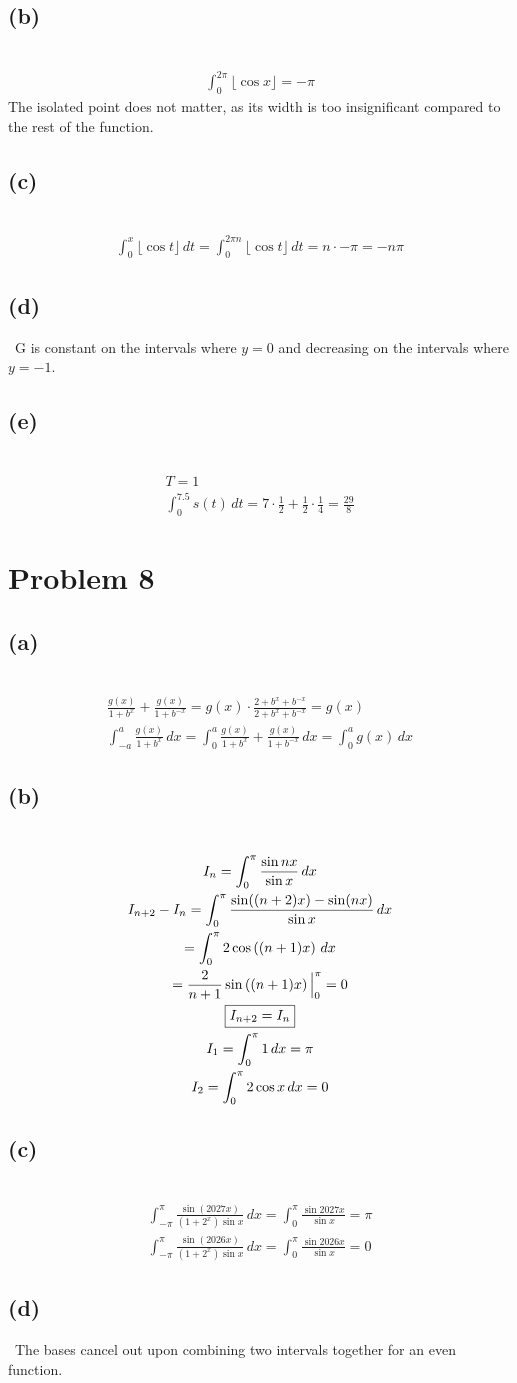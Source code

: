 \documentclass[12pt]{article}
\newcommand*{\paren}[1]{\ensuremath\left(#1\right)}
\newcommand{\floor}[1]{\lfloor #1 \rfloor}
\newcommand{\vem}{\vspace{0.5em}}
\newcommand{\problem}[1]{\section{Problem #1}}
\newcommand{\subproblem}[1]{\subsection{(#1)} \,}
\begin{document}
\subproblem{b}
\begin{gather*}
    \int_0^{2\pi} \floor{\cos x} = -\pi 
\end{gather*}
The isolated point does not matter, as its width is too insignificant compared to the rest of the function. \vem

\subproblem{c}
\begin{gather*}
    \int_0^x \floor{\cos t}\, dt = \int_0^{2\pi n} \floor{\cos t}\, dt = n\cdot -\pi =\boxed{-n\pi}
\end{gather*}

\subproblem{d}
G is constant on the intervals where $y=0$ and decreasing on the intervals where $y=-1$.\vem

\subproblem{e}
\begin{gather*}
    T=1\\
    \int_0^{7.5} s(t)\,d t=7\cdot \frac{1}{2}+ \frac{1}{2}\cdot \frac{1}{4}=\boxed{\frac{29}{8}}
\end{gather*}

\problem{8}

\subproblem{a}
\begin{gather*}
    \frac{g(x)}{1+b^x}+\frac{g(x)}{1+b^{-x}} = g(x)\cdot \frac{2+b^x+b^{-x}}{2+b^x+b^{-x}} =g(x)\\
    \int_{-a}^a \frac{g(x)}{1+b^x}\, dx= \int_0^a \frac{g(x)}{1+b^x}+\frac{g(x)}{1+b^{-x}} \, dx = \int_0^a  g(x)\, dx
\end{gather*}

\subproblem{b}
\begin{gather*}
    I_n =\int_0^\pi \frac{\sin nx}{\sin x}\, dx\\
    I_{n+2} - I_n = \int_0^\pi \frac{\sin((n+2)x) - \sin(nx)}{\sin x} \, dx\\
    =\int_0^\pi 2\cos \paren{(n+1)x}\, dx\\
    = \frac{2}{n+1} \sin \paren{(n+1)x} \Big|^\pi_0 = 0\\
    \boxed{I_{n+2} =I_n}\\
    I_1= \int_0^\pi 1\, dx =\pi \\
    I_2 = \int_0^\pi 2\cos x\, dx = 0
\end{gather*}

\subproblem{c}
\begin{gather*}
    \int_{-\pi }^\pi \frac{\sin (2027x)}{(1+2^x)\sin x}\, dx = \int_0^\pi \frac{\sin 2027 x}{\sin x} = \boxed{\pi} \\
    \int_{-\pi }^\pi \frac{\sin (2026x)}{(1+2^x)\sin x}\, dx = \int_0^\pi \frac{\sin 2026 x}{\sin x} = \boxed{0}
\end{gather*}

\subproblem{d}
The bases cancel out upon combining two intervals together for an even function.
\end{document}
